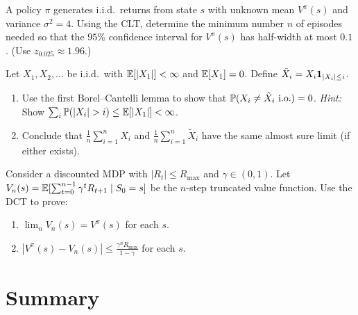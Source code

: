 \documentclass[11pt,a4paper]{article}
\begin{document}
\begin{exercise}[(**)]
\label{ex:clt_confidence}
A policy $\pi$ generates i.i.d.\ returns from state $s$ with
unknown mean $V^\pi(s)$ and variance $\sigma^2 = 4$.  Using the
CLT, determine the minimum number $n$ of episodes needed so
that the $95\%$ confidence interval for $V^\pi(s)$ has half-width
at most $0.1$.  (Use $z_{0.025} \approx 1.96$.)
\end{exercise}

\begin{exercise}[(***)]
\label{ex:slln_truncation}
Let $X_1, X_2, \ldots$ be i.i.d.\ with $\mathbb{E}[|X_1|] < \infty$
and $\mathbb{E}[X_1] = 0$.  Define $\tilde{X}_i = X_i
\mathbf{1}_{|X_i| \leq i}$.
\begin{enumerate}[label=(\alph*)]
  \item Use the first Borel--Cantelli lemma to show that
    $\mathbb{P}(X_i \neq \tilde{X}_i \text{ i.o.}) = 0$.
    \textit{Hint:} Show
    $\sum_i \mathbb{P}(|X_i| > i) \leq \mathbb{E}[|X_1|] < \infty$.
  \item Conclude that $\frac{1}{n}\sum_{i=1}^n X_i$ and
    $\frac{1}{n}\sum_{i=1}^n \tilde{X}_i$ have the same
    almost sure limit (if either exists).
\end{enumerate}
\end{exercise}

\begin{exercise}[(***)]
\label{ex:dct_rl}
Consider a discounted MDP with $|R_t| \leq R_{\max}$ and
$\gamma \in (0,1)$.  Let $V_n(s) = \mathbb{E}[\sum_{t=0}^{n-1}
\gamma^t R_{t+1} \mid S_0 = s]$ be the $n$-step truncated
value function.  Use the DCT to prove:
\begin{enumerate}[label=(\alph*)]
  \item $\lim_n V_n(s) = V^\pi(s)$ for each $s$.
  \item $|V^\pi(s) - V_n(s)| \leq
    \frac{\gamma^n R_{\max}}{1-\gamma}$ for each $s$.
\end{enumerate}
\end{exercise}


\section{Summary}
\label{sec:summary}
\end{document}
